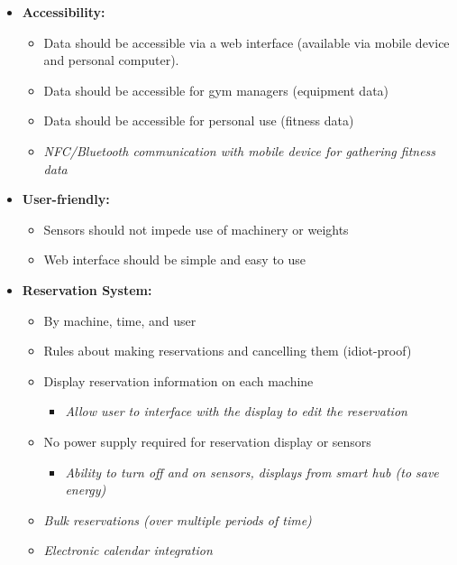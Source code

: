 \documentclass[letterpaper,11pt]{./templates/texMemo} %
\begin{document}
\begin{itemize}
    \item{\textbf{Accessibility:}}
    \begin{itemize}
        \item{Data should be accessible via a web interface (available via mobile device and personal computer).}
        \item{Data should be accessible for gym managers (equipment data)}
        \item{Data should be accessible for personal use (fitness data)}
        \item{\textit{NFC/Bluetooth communication with mobile device for gathering fitness data}}
    \end{itemize}

    \item{\textbf{User-friendly:}}
    \begin{itemize}
        \item{Sensors should not impede use of machinery or weights}
        \item{Web interface should be simple and easy to use}
    \end{itemize}

    \item{\textbf{Reservation System:}}
    \begin{itemize}
        \item{By machine, time, and user}
        \item{Rules about making reservations and cancelling them (idiot-proof)}
        \item{Display reservation information on each machine}
        \begin{itemize}
            \item{\textit{Allow user to interface with the display to edit the reservation}}
        \end{itemize}
        \item{No power supply required for reservation display or sensors}
        \begin{itemize}
            \item{\textit{Ability to turn off and on sensors, displays from smart hub (to save energy)}}
        \end{itemize}
        \item{\textit{Bulk reservations (over multiple periods of time)}}
        \item{\textit{Electronic calendar integration}}
    \end{itemize}


\end{itemize}
\end{document}
